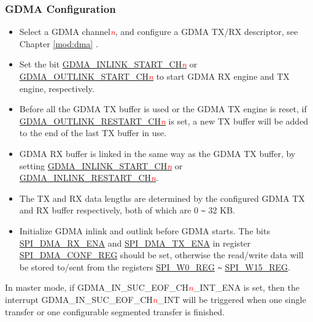\documentclass[main\_\_EN.tex]{subfiles}
\begin{document}
\subsubsection{GDMA Configuration}\label{sec:DMA-conf}


\begin{itemize}
    \item Select a GDMA channel\textcolor{red}{\it{n}}, and configure a GDMA TX/RX descriptor, see Chapter \ref{mod:dma} \textit{}.

    \item Set the bit \hyperref[fielddesc:GDMAINLINKSTARTCH0]{GDMA\_INLINK\_START\_CH\textcolor{red}{\it{n}}} or \hyperref[fielddesc:GDMAOUTLINKSTARTCH0]{GDMA\_OUTLINK\_START\_CH\textcolor{red}{\it{n}}} to start GDMA RX engine and TX engine, respectively.

    \item Before all the GDMA TX buffer is used or the GDMA TX engine is reset, if  \hyperref[fielddesc:GDMAOUTLINKRESTARTCH0]{GDMA\_OUTLINK\_RESTART\_CH\textcolor{red}{\it{n}}} is set, a new TX buffer will be added to the end of the last TX buffer in use.

    \item GDMA RX buffer is linked in the same way as the GDMA TX buffer, by setting \hyperref[fielddesc:GDMAINLINKSTARTCH0]{GDMA\_INLINK\_START\_CH\textcolor{red}{\it{n}}} or \hyperref[fielddesc:GDMAINLINKRESTARTCH0]{GDMA\_INLINK\_RESTART\_CH\textcolor{red}{\it{n}}}.

    \item The TX and RX data lengths are determined by the configured GDMA TX and RX buffer respectively, both of which are 0 \verb+~+ 32 KB.

    \item Initialize GDMA inlink and outlink before GDMA starts. The bits \hyperref[fielddesc:SPIDMARXENA]{SPI\_DMA\_RX\_ENA} and \hyperref[fielddesc:SPIDMATXENA]{SPI\_DMA\_TX\_ENA} in register \hyperref[regdesc:SPIDMACONFREG]{SPI\_DMA\_CONF\_REG} should be set, otherwise the read/write data will be stored to/sent from the registers \hyperref[regdesc:SPIW0REG]{SPI\_W0\_REG} \verb+~+ \hyperref[regdesc:SPIW15REG]{SPI\_W15\_REG}.

\end{itemize}

In master mode, if GDMA\_IN\_SUC\_EOF\_CH\textcolor{red}{\it{n}}\_INT\_ENA is set, then the interrupt GDMA\_IN\_SUC\_EOF\_CH\textcolor{red}{\it{n}}\_INT will be triggered when one single transfer or one configurable segmented transfer is finished.
\end{document}
